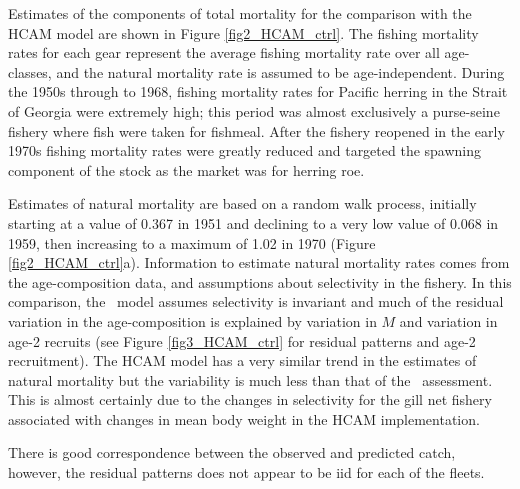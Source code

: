 Estimates of the components of total mortality for the comparison with the HCAM model are shown in Figure \ref{fig2_HCAM_ctrl}.  The fishing mortality rates for each gear represent the average fishing mortality rate over all age-classes, and the natural mortality rate is assumed to be age-independent.  During the 1950s through to 1968, fishing mortality rates for Pacific herring in the Strait of Georgia were extremely high; this period was almost exclusively a purse-seine fishery where fish were taken for fishmeal.  After the fishery reopened in the early 1970s fishing mortality rates were greatly reduced and targeted the spawning component of the stock as the market was for herring roe. 

Estimates of natural mortality are based on a random walk process, initially starting at a value of 0.367 in 1951 and declining to a very low value of 0.068 in 1959, then increasing to a maximum of 1.02 in 1970 (Figure \ref{fig2_HCAM_ctrl}a).  Information to estimate natural mortality rates comes from the age-composition data, and assumptions about selectivity in the fishery.  In this comparison, the \iscam\ model assumes selectivity is invariant and much of the residual variation in the age-composition is explained by variation in $M$ and variation in age-2 recruits (see Figure \ref{fig3_HCAM_ctrl} for residual patterns and age-2 recruitment).  The HCAM model has a very similar trend in the estimates of natural mortality but the variability is much less than that of the \iscam\ assessment.  This is almost certainly due to the changes in selectivity for the gill net fishery associated with changes in mean body weight in the HCAM implementation.

There is good correspondence between the observed and predicted catch, however, the residual patterns does not appear to be iid for each of the fleets.  

 


